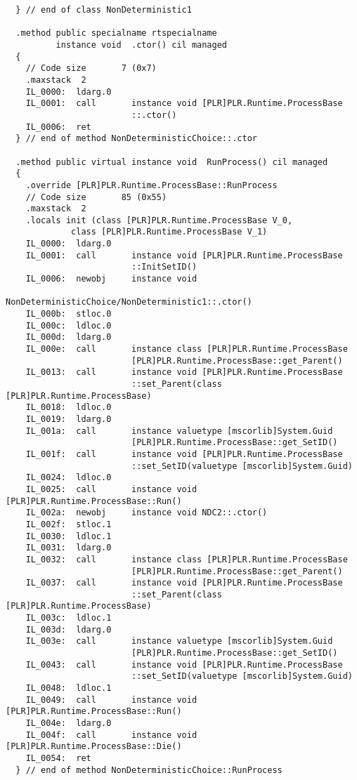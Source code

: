 \begin{lstlisting}
  } // end of class NonDeterministic1

  .method public specialname rtspecialname 
          instance void  .ctor() cil managed
  {
    // Code size       7 (0x7)
    .maxstack  2
    IL_0000:  ldarg.0
    IL_0001:  call       instance void [PLR]PLR.Runtime.ProcessBase
                         ::.ctor()
    IL_0006:  ret
  } // end of method NonDeterministicChoice::.ctor

  .method public virtual instance void  RunProcess() cil managed
  {
    .override [PLR]PLR.Runtime.ProcessBase::RunProcess
    // Code size       85 (0x55)
    .maxstack  2
    .locals init (class [PLR]PLR.Runtime.ProcessBase V_0,
             class [PLR]PLR.Runtime.ProcessBase V_1)
    IL_0000:  ldarg.0
    IL_0001:  call       instance void [PLR]PLR.Runtime.ProcessBase
                         ::InitSetID()
    IL_0006:  newobj     instance void 
                         NonDeterministicChoice/NonDeterministic1::.ctor()
    IL_000b:  stloc.0
    IL_000c:  ldloc.0
    IL_000d:  ldarg.0
    IL_000e:  call       instance class [PLR]PLR.Runtime.ProcessBase 
                         [PLR]PLR.Runtime.ProcessBase::get_Parent()
    IL_0013:  call       instance void [PLR]PLR.Runtime.ProcessBase
                         ::set_Parent(class [PLR]PLR.Runtime.ProcessBase)
    IL_0018:  ldloc.0
    IL_0019:  ldarg.0
    IL_001a:  call       instance valuetype [mscorlib]System.Guid 
                         [PLR]PLR.Runtime.ProcessBase::get_SetID()
    IL_001f:  call       instance void [PLR]PLR.Runtime.ProcessBase
                         ::set_SetID(valuetype [mscorlib]System.Guid)
    IL_0024:  ldloc.0
    IL_0025:  call       instance void [PLR]PLR.Runtime.ProcessBase::Run()
    IL_002a:  newobj     instance void NDC2::.ctor()
    IL_002f:  stloc.1
    IL_0030:  ldloc.1
    IL_0031:  ldarg.0
    IL_0032:  call       instance class [PLR]PLR.Runtime.ProcessBase 
                         [PLR]PLR.Runtime.ProcessBase::get_Parent()
    IL_0037:  call       instance void [PLR]PLR.Runtime.ProcessBase
                         ::set_Parent(class [PLR]PLR.Runtime.ProcessBase)
    IL_003c:  ldloc.1
    IL_003d:  ldarg.0
    IL_003e:  call       instance valuetype [mscorlib]System.Guid 
                         [PLR]PLR.Runtime.ProcessBase::get_SetID()
    IL_0043:  call       instance void [PLR]PLR.Runtime.ProcessBase
                         ::set_SetID(valuetype [mscorlib]System.Guid)
    IL_0048:  ldloc.1
    IL_0049:  call       instance void [PLR]PLR.Runtime.ProcessBase::Run()
    IL_004e:  ldarg.0
    IL_004f:  call       instance void [PLR]PLR.Runtime.ProcessBase::Die()
    IL_0054:  ret
  } // end of method NonDeterministicChoice::RunProcess


\end{lstlisting}
